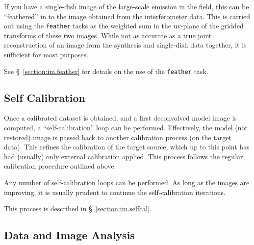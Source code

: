 If you have a single-dish image of the large-scale emission in the
field, this can be ``feathered'' in to the image obtained from
the interferometer data.  This is carried out using the 
{\tt feather} tasks as the weighted sum in the uv-plane of the gridded
transforms of these two images.  While not as accurate as a true
joint reconstruction of an image from the synthesis and single-dish
data together, it is sufficient for most purposes.

See \S~\ref{section:im.feather} for details on the use of the
{\tt feather} task.

\subsection{Self Calibration}
\label{section:intro.walkthru.selfcal}

Once a calibrated dataset is obtained, and a first deconvolved 
model image is computed, a ``self-calibration'' loop can be 
performed.  Effectively, the model (not restored) image is passed
back to another calibration process (on the target data).  This
refines the calibration of the target source, which up to this
point has had (usually) only external calibration applied.  This
process follows the regular calibration procedure outlined above.

Any number of self-calibration loops can be performed.  As long
as the images are improving, it is usually prudent to continue
the self-calibration iterations.

This process is described in \S~\ref{section:im.selfcal}.

\subsection{Data and Image Analysis}
\label{section:intro.walkthru.analysis}


